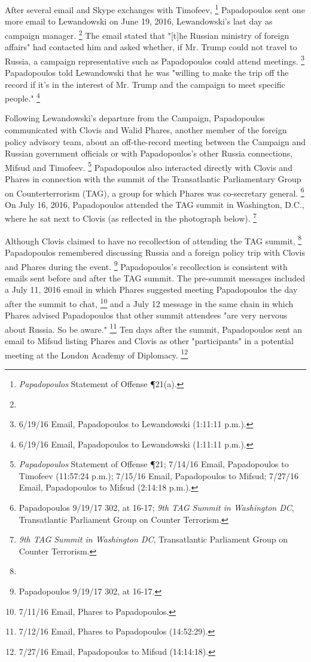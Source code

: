 After several email and Skype exchanges with Timofeev,%
\footnote{\textit{Papadopoulos} Statement of Offense \P 21(a).}
Papadopoulos sent one more email to Lewandowski on June 19, 2016, Lewandowski's last day as campaign manager.%
\footnote{}
The email stated that "[t]he Russian ministry of foreign affairs" had contacted him and asked whether, if Mr. Trump could not travel to Russia, a campaign representative such as Papadopoulos could attend meetings.%
\footnote{6/19/16 Email, Papadopoulos to Lewandowski (1:11:11 p.m.).}
Papadopoulos told Lewandowski that he was "willing to make the trip off the record if it's in the interest of Mr. Trump and the campaign to meet specific people."%
\footnote{6/19/16 Email, Papadopoulos to Lewandowski (1:11:11 p.m.).}

Following Lewandowski's departure from the Campaign, Papadopoulos communicated with Clovis and Walid Phares, another member of the foreign policy advisory team, about an off-the-record meeting between the Campaign and Russian government officials or with Papadopoulos's other Russia connections, Mifsud and Timofeev.%
\footnote{\textit{Papadopoulos} Statement of Offense \P 21;
7/14/16 Email, Papadopoulos to Timofeev (11:57:24 p.m.);
7/15/16 Email, Papadopoulos to Mifsud;
7/27/16 Email, Papadopoulos to Mifsud (2:14:18 p.m.).}
Papadopoulos also interacted directly with Clovis and Phares in connection with the summit of the Transatlantic Parliamentary Group on Counterterrorism (TAG), a group for which Phares was co-secretary general.%
\footnote{Papadopoulos 9/19/17 302, at 16-17;
\textit{9th TAG Summit in Washington DC}, Transatlantic Parliament Group on Counter Terrorism.}
On July 16, 2016, Papadopoulos attended the TAG summit in Washington, D.C., where he sat next to Clovis (as reflected in the photograph below).%
\footnote{\textit{9th TAG Summit in Washington DC}, Transatlantic Parliament Group on Counter Terrorism.}


Although Clovis claimed to have no recollection of attending the TAG summit,%
\footnote{}
Papadopoulos remembered discussing Russia and a foreign policy trip with Clovis and Phares during the event.%
\footnote{Papadopoulos 9/19/17 302, at 16-17.}
Papadopoulos's recollection is consistent with emails sent before and after the TAG summit.
The pre-summit messages included a July 11, 2016 email in which Phares suggested meeting Papadopoulos the day after the summit to chat,%
\footnote{7/11/16 Email, Phares to Papadopoulos.}
and a July 12 message in the same chain in which Phares advised Papadopoulos that other summit attendees "are very nervous about Russia. So be aware."%
\footnote{7/12/16 Email, Phares to Papadopoulos (14:52:29).}
Ten days after the summit, Papadopoulos sent an email to Mifsud listing Phares and Clovis as other "participants" in a potential meeting at the London Academy of Diplomacy.%
\footnote{7/27/16 Email, Papadopoulos to Mifsud (14:14:18).}

